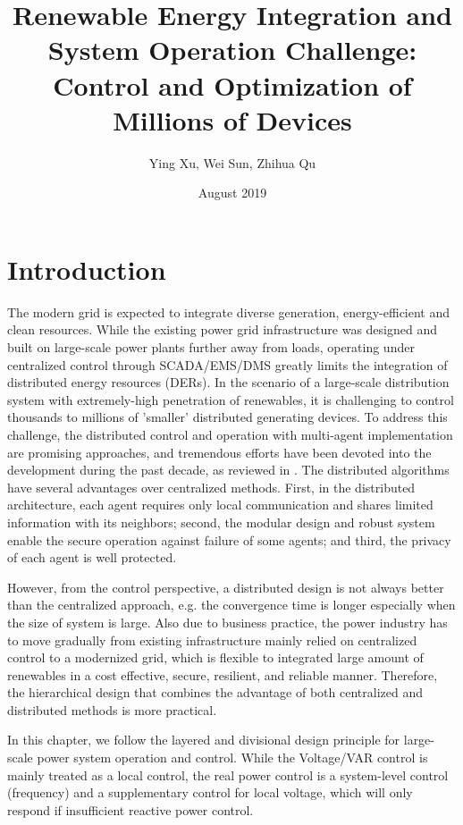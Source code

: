 \documentclass{article}
\title{Renewable Energy Integration and System Operation Challenge:
 Control and Optimization of Millions of Devices}
\author{Ying Xu, Wei Sun, Zhihua Qu}
\date{August 2019}
\begin{document}
\maketitle

\section{Introduction}

The modern grid is expected to integrate diverse generation, energy-efficient and clean resources. While the existing power grid infrastructure was designed and built on large-scale power plants further away from loads, operating under centralized control through SCADA/EMS/DMS greatly limits the integration of distributed energy resources (DERs). 
In the scenario of a large-scale distribution system with extremely-high penetration of renewables, it is challenging to control thousands to millions of 'smaller' distributed generating devices. To address this challenge, the distributed control and operation with multi-agent implementation are promising approaches, and tremendous efforts have been devoted into the development during the past decade, as reviewed in \cite{molzahn2017survey}.
The distributed algorithms have several advantages over centralized methods. First, in the distributed architecture, each agent requires only local communication and shares limited information with its neighbors; second, the modular design and robust system enable the secure operation against failure of some agents; and third, the privacy of each agent is well protected.

However, from the control perspective, a distributed design is not always better than the centralized approach, e.g. the convergence time is longer especially when the size of system is large. Also due to business practice, the power industry has to move gradually from existing infrastructure mainly relied on centralized control to a modernized grid, which is flexible to integrated large amount of renewables in a cost effective, secure, resilient, and reliable manner. Therefore, the hierarchical design \cite{xia2018fully} that combines the advantage of both centralized and distributed methods is more practical.

In this chapter, we follow the layered and divisional design principle for large-scale power system operation and control.
While the Voltage/VAR control is mainly treated as a local control, the real power control is a system-level control (frequency) and a supplementary control for local voltage, which will only respond if insufficient reactive power control. 
\end{document}
